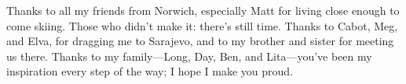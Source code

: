 Thanks to all my friends from Norwich, especially Matt for living close enough to come skiing.
Those who didn't make it: there's still time.
Thanks to Cabot, Meg, and Elva, for dragging me to Sarajevo, and to my brother and sister for meeting us there.
Thanks to my family---Long, Day, Ben, and Lita---you've been my inspiration every step of the way; I hope I make you proud.










